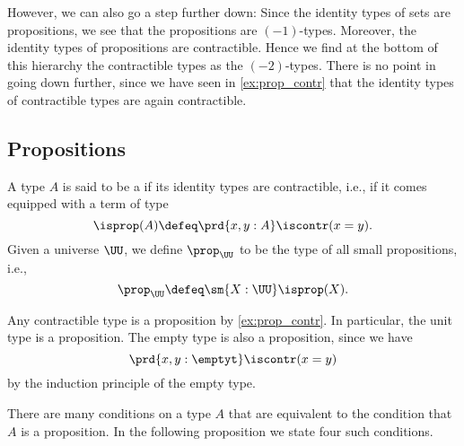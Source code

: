 However, we can also go a step further down: Since the identity types of sets are propositions, we see that the propositions are $(-1)$-types. Moreover, the identity types of propositions are contractible. Hence we find at the bottom of this hierarchy the contractible types as the $(-2)$-types. There is no point in going down further, since we have seen in \cref{ex:prop_contr} that the identity types of contractible types are again contractible.


\subsection{Propositions}

\begin{defn}
A type $A$ is said to be a  if its identity types are contractible, i.e., if it comes equipped with a term of type
\begin{equation*}
\isprop(A)\defeq\prd{x,y:A}\iscontr(x=y).
\end{equation*}
Given a universe $\UU$, we define $\prop_\UU$ to be the type of all small propositions, i.e.,
\begin{equation*}
  \prop_\UU\defeq\sm{X:\UU}\isprop(X).
\end{equation*}
\end{defn}

\begin{eg}\label{eg:prop_contr}
  Any contractible type is a proposition by \cref{ex:prop_contr}. In particular, the unit type is a proposition. The empty type is also a proposition, since we have
\begin{equation*}
\prd{x,y:\emptyt}\iscontr(x=y)
\end{equation*}
by the induction principle of the empty type.
\end{eg}

There are many conditions on a type $A$ that are equivalent to the condition that $A$ is a proposition. In the following proposition we state four such conditions.

